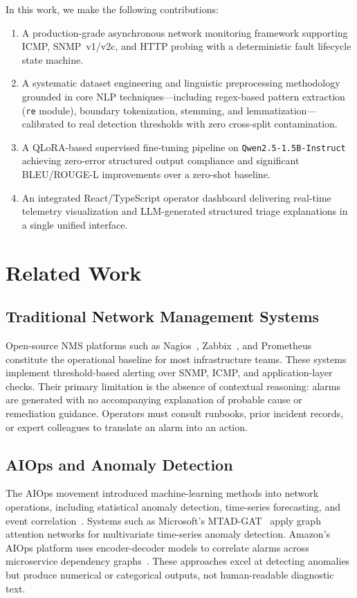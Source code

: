 \documentclass[conference]{IEEEtran}
\begin{document}
In this work, we make the following contributions:
\begin{enumerate}
    \item A production-grade asynchronous network monitoring framework supporting ICMP, SNMP~v1/v2c, and HTTP probing with a deterministic fault lifecycle state machine.
    \item A systematic dataset engineering and linguistic preprocessing methodology grounded in core NLP techniques---including regex-based pattern extraction (\texttt{re} module), boundary tokenization, stemming, and lemmatization---calibrated to real detection thresholds with zero cross-split contamination.
    \item A QLoRA-based supervised fine-tuning pipeline on \texttt{Qwen2.5-1.5B-Instruct} achieving zero-error structured output compliance and significant BLEU/ROUGE-L improvements over a zero-shot baseline.
    \item An integrated React/TypeScript operator dashboard delivering real-time telemetry visualization and LLM-generated structured triage explanations in a single unified interface.
\end{enumerate}

\section{Related Work}
\label{sec:related}

\subsection{Traditional Network Management Systems}
Open-source NMS platforms such as Nagios~\cite{nagios}, Zabbix~\cite{zabbix}, and Prometheus~\cite{prometheus} constitute the operational baseline for most infrastructure teams. These systems implement threshold-based alerting over SNMP, ICMP, and application-layer checks. Their primary limitation is the absence of contextual reasoning: alarms are generated with no accompanying explanation of probable cause or remediation guidance. Operators must consult runbooks, prior incident records, or expert colleagues to translate an alarm into an action.

\subsection{AIOps and Anomaly Detection}
The AIOps movement introduced machine-learning methods into network operations, including statistical anomaly detection, time-series forecasting, and event correlation~\cite{dang2019aiops}. Systems such as Microsoft's MTAD-GAT~\cite{zhao2020multivariate} apply graph attention networks for multivariate time-series anomaly detection. Amazon's AIOps platform uses encoder-decoder models to correlate alarms across microservice dependency graphs~\cite{chen2019outage}. These approaches excel at detecting anomalies but produce numerical or categorical outputs, not human-readable diagnostic text.
\end{document}
